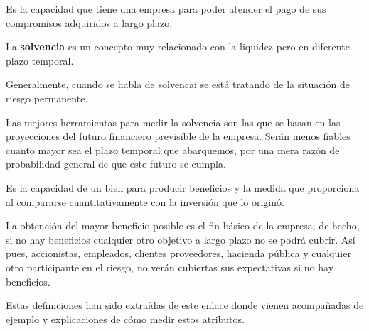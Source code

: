 \documentclass[nochap,palatino,shortheader]{apuntes}
\begin{document}
\begin{defn}[Solvencia]
Es la capacidad que tiene una empresa para poder atender el pago de sus compromisos adquiridos a largo plazo.

La \textbf{solvencia} es un concepto muy relacionado con la liquidez pero en diferente plazo temporal.

Generalmente, cuando se habla de solvencai se está tratando de la situación de riesgo permanente.

Las mejores herramientas para medir la solvencia son las que se basan en las proyecciones del futuro financiero previsible de la empresa. Serán menos fiables cuanto mayor sea el plazo temporal que abarquemos, por una mera razón de probabilidad general de que este futuro se cumpla.
\end{defn}

\begin{defn}[Rentabilidad]
Es la capacidad de un bien para producir beneficios y la medida que proporciona al compararse cuantitativamente con la inversión que lo originó.

La obtención del mayor beneficio posible es el fin básico de la empresa; de hecho, si no hay beneficios cualquier otro objetivo a largo plazo no se podrá cubrir. Así pues, accionistas, empleados, clientes proveedores, hacienda pública y cualquier otro participante en el riesgo, no verán cubiertas sus expectativas si no hay beneficios.
\end{defn}

Estas definiciones han sido extraídas de \href{http://webs.ono.com/martinpascual/pv70601_tresconceptos.pdf}{este enlace} donde vienen acompañadas de ejemplo y explicaciones de cómo medir estos atributos.
\end{document}

